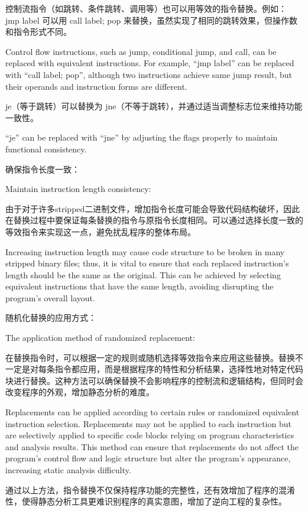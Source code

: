 控制流指令（如跳转、条件跳转、调用等）也可以用等效的指令替换。例如：
jmp label 可以用 call label; pop 来替换，虽然实现了相同的跳转效果，但操作数和指令形式不同。

Control flow instructions, such as jump, conditional jump, and call, can be replaced with equivalent instructions. For example, “jmp label” can be replaced with “call label; pop”, although two instructions achieve same jump result, but their operands and instruction forms are different.

je（等于跳转）可以替换为 jne（不等于跳转），并通过适当调整标志位来维持功能一致性。

“je” can be replaced with “jne” by adjusting the flags properly to maintain functional consistency.

确保指令长度一致：

Maintain instruction length consistency:

由于对于许多stripped二进制文件，增加指令长度可能会导致代码结构破坏，因此在替换过程中要保证每条替换的指令与原指令长度相同。可以通过选择长度一致的等效指令来实现这一点，避免扰乱程序的整体布局。

Increasing instruction length may cause code structure to be broken in many stripped binary files; thus, it is vital to ensure that each replaced instruction's length should be the same as the original. This can be achieved by selecting equivalent instructions that have the same length, avoiding disrupting the program's overall layout.

随机化替换的应用方式：

The application method of randomized replacement:

在替换指令时，可以根据一定的规则或随机选择等效指令来应用这些替换。替换不一定是对每条指令都应用，而是根据程序的特性和分析结果，选择性地对特定代码块进行替换。这种方法可以确保替换不会影响程序的控制流和逻辑结构，但同时会改变程序的外观，增加静态分析的难度。

Replacements can be applied according to certain rules or randomized equivalent instruction selection. Replacements may not be applied to each instruction but are selectively applied to specific code blocks relying on program characteristics and analysis results. This method can ensure that replacements do not affect the program's control flow and logic structure but alter the program's appearance, increasing static analysis difficulty.

通过以上方法，指令替换不仅保持程序功能的完整性，还有效增加了程序的混淆性，使得静态分析工具更难识别程序的真实意图，增加了逆向工程的复杂性。

